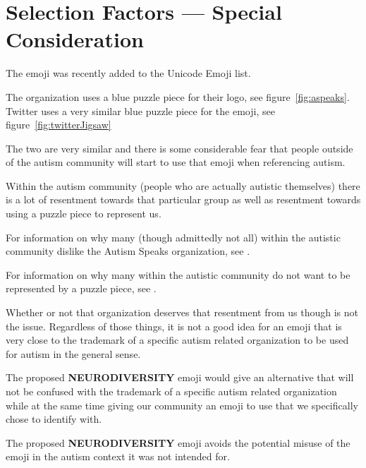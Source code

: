 \section{Selection Factors --- Special Consideration}

The emoji \jigsawemoji{} was recently added to the Unicode Emoji list.

The organization  uses a blue puzzle
piece for their logo, see figure~\ref{fig:aspeaks}. Twitter uses a very similar blue
puzzle piece for the \jigsawemoji{} emoji, see figure~\ref{fig:twitterJigsaw}

The two are very similar and there is some considerable fear that people outside of the
autism community will start to use that emoji when referencing autism.

Within the autism community (people who are actually autistic themselves) there is a lot of
resentment towards that particular group as well as resentment towards using a puzzle piece
to represent us.

For information on why many (though admittedly not all) within the autistic community dislike
the Autism Speaks organization, see
.

For information on why many within the autistic community do not want to be represented by a
puzzle piece, see
.

Whether or not that organization deserves that resentment from us though is not the issue.
Regardless of those things, it is not a good idea for an emoji that is very close to the
trademark of a specific autism related organization to be used for autism in the general
sense.

The proposed \textbf{NEURODIVERSITY} emoji would give an alternative that will not be confused
with the trademark of a specific autism related organization while at the same time giving our
community an emoji to use that we specifically chose to identify with.

The proposed \textbf{NEURODIVERSITY} emoji avoids the potential misuse of the \jigsawemoji{}
emoji in the autism context it was not intended for.

